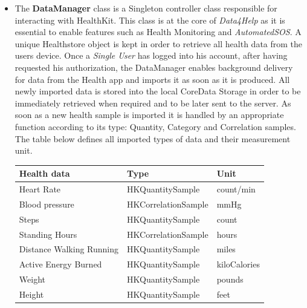 \documentclass[titlepage]{article}
\begin{document}
	\begin{itemize}
		\item The {\bf DataManager} class is a Singleton controller class responsible for interacting with HealthKit. This class is at the core of {\it Data4Help} as it is essential to enable features such as Health Monitoring and {\it AutomatedSOS}.
		A unique Healthstore object is kept in order to retrieve all health data from the user\textsc{}s device.
		Once a {\it {\it Single User}} has logged into his account, after having requested his authorization, the DataManager enables background delivery for data from the Health app and imports it as soon as it is produced. All newly imported data is stored into the local CoreData Storage in order to be immediately retrieved when required and to be later sent to the server. As soon as a new health sample is imported it is handled by an appropriate function according to its type: Quantity, Category and Correlation samples. The table below defines all imported types of data and their measurement unit.
		
		\renewcommand*{\arraystretch}{1.4}
		\begin{longtable}{| p{4 cm} | p{4 cm} | p{2 cm} |} \hline
			{\bf Health data} & {\bf Type}  & {\bf Unit} \\ \hline
			Heart Rate & HKQuantitySample & count/min \\ \hline
			Blood pressure & HKCorrelationSample & mmHg \\ \hline
			Steps & HKQuantitySample & count \\ \hline
			Standing Hours & HKCorrelationSample & hours \\ \hline
			Distance Walking Running & HKQuantitySample & miles \\ \hline
			Active Energy Burned & HKQuantitySample & kiloCalories \\ \hline
			Weight & HKQuantitySample & pounds \\ \hline
			Height & HKQuantitySample & feet \\ \hline
		\end{longtable}
		

\end{itemize}
\end{document}
